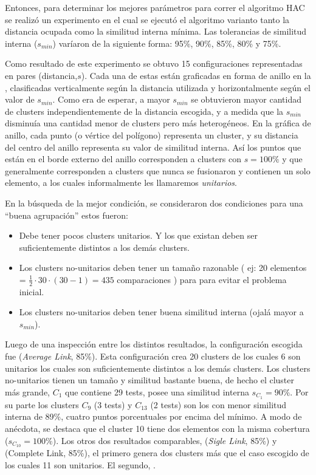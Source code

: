 \par Entonces, para determinar los mejores parámetros para correr el algoritmo HAC se realizó un experimento en el cual se ejecutó el algoritmo varianto tanto la distancia ocupada como la similitud interna mínima. Las tolerancias de similitud interna ($s_{min}$) varíaron de la siguiente forma: 95\%, 90\%, 85\%, 80\% y 75\%.

\par Como resultado de este experimento se obtuvo 15 configuraciones representadas en pares (distancia,$s$). Cada una de estas están graficadas en forma de anillo en la , clasificadas verticalmente según la distancia utilizada y horizontalmente según el valor de $s_{min}$. Como era de esperar, a mayor $s_{min}$ se obtuvieron mayor cantidad de clusters independientemente de la distancia escogida, y a medida que la $s_{min}$ disminuía una cantidad menor de clusters pero más heterogéneos. En la gráfica de anillo, cada punto (o vértice del polígono) representa un cluster, y su distancia del centro del anillo representa su valor de similitud interna. Así los puntos que están en el borde externo del anillo corresponden a clusters con $s=100\%$ y que generalmente corresponden a clusters que nunca se fusionaron y contienen un solo elemento, a los cuales informalmente les llamaremos \textit{unitarios}.

\par En la búsqueda de la mejor condición, se consideraron dos condiciones para una ``buena agrupación'' estos fueron:
\begin{itemize}
\item Debe tener pocos clusters unitarios. Y los que existan deben ser suficientemente distintos a los demás clusters.
\item Los clusters no-unitarios deben tener un tamaño razonable ( ej: 20 elementos = $\frac{1}{2} \cdot 30 \cdot (30 - 1)=435$ comparaciones ) para para evitar el problema inicial.
\item Los clusters no-unitarios deben tener buena similitud interna (ojalá mayor a $s_{min}$).
\end{itemize}

\par Luego de una inspección entre los distintos resultados, la configuración escogida fue (\emph{Average Link}, 85\%). Esta configuración crea 20 clusters de los cuales 6 son unitarios los cuales son suficientemente distintos a los demás clusters. Los clusters no-unitarios tienen un tamaño y similitud bastante buena, de hecho el cluster más grande, $C_1$ que contiene 29 tests, posee una similitud interna $s_{C_{1}}=90\%$. Por su parte los clusters $C_9$ (3 tests) y $C_13$ (2 tests) son los con menor similitud interna de 89\%, cuatro puntos porcentuales por encima del mínimo. A modo de anécdota, se destaca que el cluster 10 tiene dos elementos con la misma cobertura ($s_{C_{10}}=100\%$). Los otros dos resultados comparables, (\emph{Sigle Link}, 85\%) y (Complete Link, 85\%), el primero genera dos clusters más que el caso escogido de los cuales 11 son unitarios. El segundo, .

